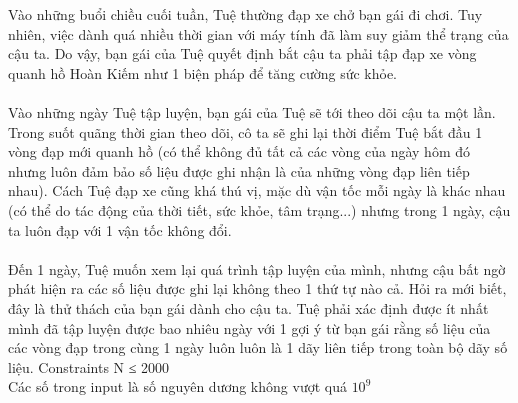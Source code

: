 Vào những buổi chiều cuối tuần, Tuệ thường đạp xe chở bạn gái đi chơi. Tuy nhiên, việc dành quá nhiều thời gian với máy tính đã làm suy giảm thể trạng của cậu ta. Do vậy, bạn gái của Tuệ quyết định bắt cậu ta phải tập đạp xe vòng quanh hồ Hoàn Kiếm như 1 biện pháp để tăng cường sức khỏe.   
\\
\\   Vào những ngày Tuệ tập luyện, bạn gái của Tuệ sẽ tới theo dõi cậu ta một lần. Trong suốt quãng thời gian theo dõi, cô ta sẽ ghi lại thời điểm Tuệ bắt đầu 1 vòng đạp mới quanh hồ (có thể không đủ tất cả các vòng của ngày hôm đó nhưng luôn đảm bảo số liệu được ghi nhận là của những vòng đạp liên tiếp nhau). Cách Tuệ đạp xe cũng khá thú vị, mặc dù vận tốc mỗi ngày là khác nhau (có thể do tác động của thời tiết, sức khỏe, tâm trạng...) nhưng trong 1 ngày, cậu ta luôn đạp với 1 vận tốc không đổi.   
\\
\\   Đến 1 ngày, Tuệ muốn xem lại quá trình tập luyện của mình, nhưng cậu bất ngờ phát hiện ra các số liệu được ghi lại không theo 1 thứ tự nào cả. Hỏi ra mới biết, đây là thử thách của bạn gái dành cho cậu ta. Tuệ phải xác định được ít nhất mình đã tập luyện được bao nhiêu ngày với 1 gợi ý từ bạn gái rằng số liệu của các vòng đạp trong cùng 1 ngày luôn luôn là 1 dãy liên tiếp trong toàn bộ dãy số liệu.
   Constraints  
N ≤ 2000   
\\   Các số trong input là số nguyên dương không vượt quá $10^{9}$